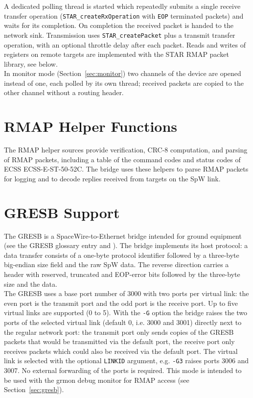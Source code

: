 A dedicated polling thread is started which repeatedly submits a single receive
transfer operation (\texttt{STAR\_createRxOperation} with \texttt{EOP}
terminated packets) and waits for its completion. On completion the received
packet is handed to the network sink. Transmission uses
\texttt{STAR\_createPacket} plus a transmit transfer operation, with an
optional throttle delay after each packet. Reads and writes of registers on
remote targets are implemented with the STAR RMAP packet library, see below.
\\
In monitor mode (Section~\ref{sec:monitor}) two channels of the device are
opened instead of one, each polled by its own thread; received packets are
copied to the other channel without a routing header.

\section{RMAP Helper Functions}

The RMAP helper sources provide verification, CRC-8 computation, and parsing
of RMAP packets, including a table of the command codes and status codes of
\gls{ECSS} ECSS-E-ST-50-52C. The bridge uses these helpers to parse RMAP
packets for logging and to decode replies received from targets on the
\gls{SpW} link.

\section{GRESB Support}

The GRESB is a \gls{SpaceWire}-to-Ethernet bridge intended for ground
equipment (see the \gls{GRESB} glossary entry and
\cite{GRESBUM}). The bridge implements its host protocol: a data transfer
consists of a one-byte protocol identifier followed by a three-byte big-endian
size field and the raw \gls{SpW} data. The reverse direction carries a header
with reserved, truncated and \gls{EOP}-error bits followed by the three-byte
size and the data.
\\

The GRESB uses a base port number of 3000 with two ports per virtual link:
the even port is the transmit port and the odd port is the receive port. Up
to five virtual links are supported (0 to 5). With the \texttt{-G} option the
bridge raises the two ports of the selected virtual link (default 0, i.e. 3000
and 3001) directly next to the regular network port: the transmit port only
sends copies of the GRESB packets that would be transmitted via the default
port, the receive port only receives packets which could also be received via
the default port. The virtual link is selected with the optional
\texttt{LINKID} argument, e.g. \texttt{-G3} raises ports 3006 and 3007. No
external forwarding of the ports is required. This mode is intended to be
used with the grmon debug monitor for \gls{RMAP} access (see
Section~\ref{sec:gresb}).

